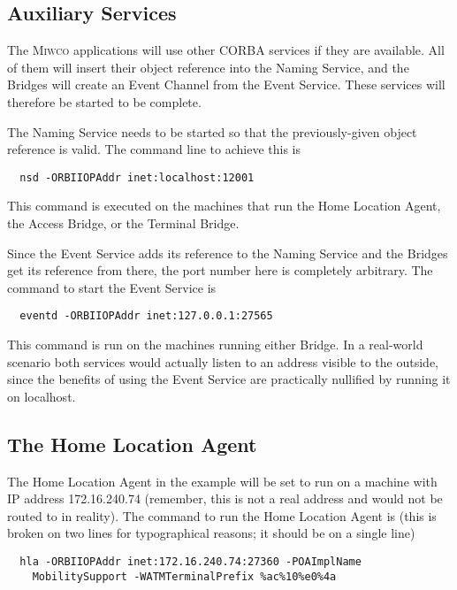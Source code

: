 \documentclass[12pt,a4paper,draft]{article}
\newcommand{\MIWCO}{\textsc{Miwco}}
\begin{document}
\subsection{Auxiliary Services}

The \MIWCO{} applications will use other CORBA services if they are
available.  All of them will insert their object reference into the
Naming Service, and the Bridges will create an Event Channel from the
Event Service.  These services will therefore be started to be
complete.

The Naming Service needs to be started so that the previously-given
object reference is valid.  The command line to achieve this is

\small
\begin{verbatim}
  nsd -ORBIIOPAddr inet:localhost:12001
\end{verbatim}
\normalsize

This command is executed on the machines that run the Home Location
Agent, the Access Bridge, or the Terminal Bridge.

Since the Event Service adds its reference to the Naming Service and
the Bridges get its reference from there, the port number here is
completely arbitrary.  The command to start the Event Service is

\small
\begin{verbatim}
  eventd -ORBIIOPAddr inet:127.0.0.1:27565
\end{verbatim}
\normalsize

This command is run on the machines running either Bridge.  In a
real-world scenario both services would actually listen to an address
visible to the outside, since the benefits of using the Event Service
are practically nullified by running it on localhost.

\subsection{The Home Location Agent}

The Home Location Agent in the example will be set to run on a machine
with IP address 172.16.240.74 (remember, this is not a real address
and would not be routed to in reality).  The command to run the Home
Location Agent is (this is broken on two lines for typographical
reasons; it should be on a single line)

\small
\begin{verbatim}
  hla -ORBIIOPAddr inet:172.16.240.74:27360 -POAImplName
    MobilitySupport -WATMTerminalPrefix %ac%10%e0%4a
\end{verbatim}
\normalsize
\end{document}
